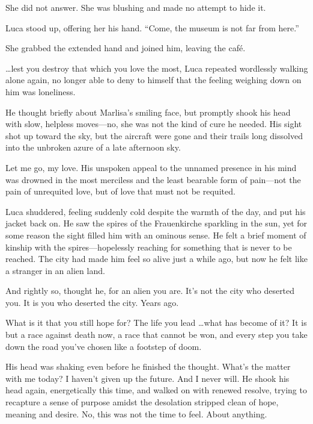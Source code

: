 She did not answer. She was blushing and made no attempt to hide it.

Luca stood up, offering her his hand. ``Come, the museum is not far from here.''

She grabbed the extended hand and joined him, leaving the café.

\sectionline

\ldots{}lest you destroy that which you love the most, Luca repeated wordlessly walking alone again, no longer able to deny to himself that the feeling weighing down on him was loneliness.

He thought briefly about Marlisa's smiling face, but promptly shook his head with slow, helpless moves---no, she was not the kind of cure he needed. His sight shot up toward the sky, but the aircraft were gone and their trails long dissolved into the unbroken azure of a late afternoon sky.

Let me go, my love. His unspoken appeal to the unnamed presence in his mind was drowned in the most merciless and the least bearable form of pain---not the pain of unrequited love, but of love that must not be requited.

Luca shuddered, feeling suddenly cold despite the warmth of the day, and put his jacket back on. He saw the spires of the Frauenkirche sparkling in the sun, yet for some reason the sight filled him with an ominous sense. He felt a brief moment of kinship with the spires---hopelessly reaching for something that is never to be reached. The city had made him feel so alive just a while ago, but now he felt like a stranger in an alien land.

And rightly so, thought he, for an alien you are. It's not the city who deserted you. It is you who deserted the city. Years ago.

What is it that you still hope for? The life you lead \ldots what has become of it? It is but a race against death now, a race that cannot be won, and every step you take down the road you've chosen like a footstep of doom.

His head was shaking even before he finished the thought. What's the matter with me today? I haven't given up the future. And I never will. He shook his head again, energetically this time, and walked on with renewed resolve, trying to recapture a sense of purpose amidst the desolation stripped clean of hope, meaning and desire. No, this was not the time to feel. About anything.

\sectionline

